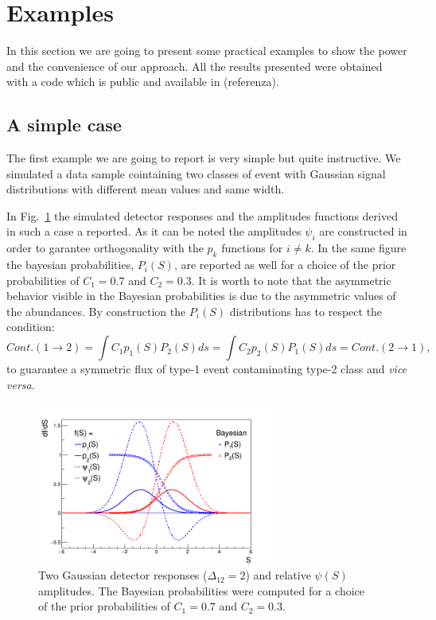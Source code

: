 \section{Examples}
In this section we are going to present some practical examples
to show the power and the convenience of our approach.
All the results presented were obtained with a code which is public and
available in (referenza).
\subsection{A simple case}
The first example we are going to report is very simple but quite instructive.
We simulated a data sample cointaining two classes of event with Gaussian
signal distributions with different mean values and same width.

In Fig.~\ref{fig:Gaus2} the simulated detector responses and the amplitudes
functions derived in such a case a reported. As it can be noted the amplitudes
$\psi_{i}$ are constructed in order to garantee orthogonality with the $p_{k}$
functions for $i \neq k$. In the same figure the bayesian probabilities,
$P_{i}(S)$, are reported as well for a choice of the prior probabilities of
$C_{1}=0.7$ and $C_{2}=0.3$. It is worth to note that the asymmetric behavior
visible in the Bayesian probabilities is due to the asymmetric values of the
abundances. By construction the $P_{i}(S)$ distributions has to respect the
condition:
\begin{equation} 
\label{Sec3:BayesCond}
Cont. (1\rightarrow 2) = \int C_{1} p_{1}(S) P_{2}(S) ds = \int
C_{2} p_{2}(S) P_{1}(S) ds = Cont. (2\rightarrow 1),
\end{equation}
to guarantee a symmetric flux of type-1 event contaminating type-2 class and 
{\it vice versa}.

\begin{figure}[!htb]
\centering
\includegraphics[width=0.7\textwidth]{../png/figGaus2.png}
\caption{Two Gaussian detector responses ($\Delta_{12} = 2$) and relative
  $\psi(S)$ amplitudes. The Bayesian probabilities were computed for a choice
  of the prior probabilities of $C_{1}=0.7$ and $C_{2}=0.3$.}
\label{fig:Gaus2}
\end{figure}

